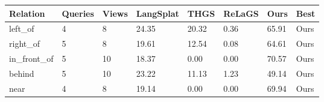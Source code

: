 \begin{tabular}{llllllll}
\hline
Relation & Queries & Views & LangSplat & THGS & ReLaGS & Ours & Best \\
\hline
left\_of & 4 & 8 & 24.35 & 20.32 & 0.36 & 65.91 & Ours \\
right\_of & 5 & 8 & 19.61 & 12.54 & 0.08 & 64.61 & Ours \\
in\_front\_of & 5 & 10 & 18.37 & 0.00 & 0.00 & 70.57 & Ours \\
behind & 5 & 10 & 23.22 & 11.13 & 1.23 & 49.14 & Ours \\
near & 4 & 8 & 19.14 & 0.00 & 0.00 & 69.94 & Ours \\
\hline
\end{tabular}
